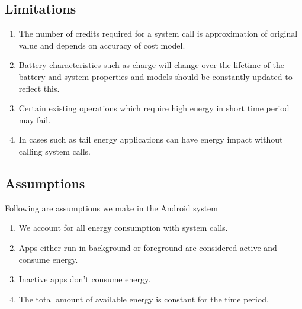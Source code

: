 \subsection{Limitations}

\begin{enumerate}

\item  The number of credits required for a system call is approximation of original value and depends on accuracy of cost model.
\item  Battery characteristics such as charge will change over the lifetime of the battery and system properties and models should be constantly updated to reflect this.   
\item  Certain existing operations which require high energy in short time period may fail.
\item  In cases such as tail energy applications can have energy impact without calling system calls.

\end{enumerate}

\subsection{Assumptions}

Following are assumptions we make in the Android system

\begin{enumerate}

\item  We account for all energy consumption with system calls.
\item  Apps either run in background or foreground are considered active and consume energy.
\item  Inactive apps don't consume energy.
\item  The total amount of available energy is constant for the time period.

\end{enumerate}




















